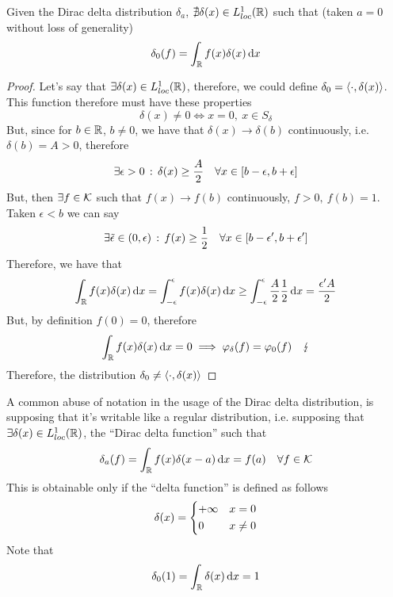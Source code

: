 \documentclass[../complete.tex]{subfiles}
\begin{document}
\begin{thm}
	Given the Dirac delta distribution $\delta_a$, $\nexists\delta(x)\in L^1_{loc}(\mathbb{R})$ such that (taken $a=0$ without loss of generality)
	\begin{equation*}
		\delta_0(f)=\int_{\mathbb{R}}^{}f(x)\delta(x)\operatorname{d\!} x
	\end{equation*}
\end{thm}
\begin{proof}
	Let's say that $\exists\delta(x)\in L^1_{loc}(\mathbb{R})$, therefore, we could define $\delta_0=\langle \cdot, \delta(x) \rangle$. This function therefore must have these properties
	\begin{equation*}
		\delta(x)\ne0\iff x=0,\ x\in S_\delta
	\end{equation*}
	But, since for $b\in\mathbb{R}$, $b\ne0$, we have that $\delta(x)\to\delta(b)$ continuously, i.e. $\delta(b)=A>0$, therefore
	\begin{equation*}
		\exists\epsilon>0\, :\, \delta(x)\ge\frac{A}{2}\quad\forall x\in[b-\epsilon,b+\epsilon]
	\end{equation*}
	But, then $\exists f\in\mathcal{K}$ such that $f(x)\to f(b)$ continuously, $f>0,\ f(b)=1$. Taken $\epsilon<b$ we can say
	\begin{equation*}
		\exists\tilde{\epsilon}\in(0,\epsilon)\, :\,  f(x)\ge\frac{1}{2}\quad\forall x\in[b-\epsilon',b+\epsilon']
	\end{equation*}
	Therefore, we have that
	\begin{equation*}
		\int_{\mathbb{R}}^{}f(x)\delta(x)\operatorname{d\!} x=\int_{-\epsilon}^{\epsilon}f(x)\delta(x)\operatorname{d\!} x\ge\int_{-\epsilon}^{\epsilon}\frac{A}{2}\frac{1}{2}\operatorname{d\!} x=\frac{\epsilon'A}{2}
	\end{equation*}
	But, by definition $f(0)=0$, therefore
	\begin{equation*}
		\int_{\mathbb{R}}^{}f(x)\delta(x)\operatorname{d\!} x=0\implies\varphi_\delta(f)=\varphi_0(f)\quad\lightning
	\end{equation*}
	Therefore, the distribution $\delta_0\ne\langle \cdot, \delta(x) \rangle$
\end{proof}
\begin{ntn}
	A common abuse of notation in the usage of the Dirac delta distribution, is supposing that it's writable like a regular distribution, i.e. supposing that $\exists\delta(x)\in L^1_{loc}(\mathbb{R})$, the ``Dirac delta function'' such that
	\begin{equation*}
		\delta_a(f)=\int_{\mathbb{R}}^{}f(x)\delta(x-a)\operatorname{d\!} x=f(a)\quad\forall f\in\mathcal{K}
	\end{equation*}
	This is obtainable only if the ``delta function'' is defined as follows
	\begin{equation}
		\delta(x)=\begin{dcases}
			+\infty&x=0\\
			0&x\ne0
		\end{dcases}
		\label{eq:deltafunction}
	\end{equation}
	Note that
	\begin{equation*}
		\delta_0(1)=\int_{\mathbb{R}}^{}\delta(x)\operatorname{d\!} x=1
	\end{equation*}
\end{ntn}
\end{document}
